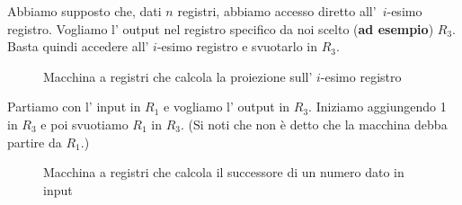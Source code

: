 \begin{esempio}[Proiezione \( p_n^i(x_1, \ldots, x_n)=x_i \).]

    Abbiamo supposto che, dati \( n \) registri, abbiamo accesso
    diretto \mbox{all' \( i \)-esimo} registro. Vogliamo l' output nel
    registro specifico da noi scelto (\textbf{ad esempio}) \( R_{3}
\). Basta quindi accedere all' \( i \)-esimo registro e svuotarlo
    in \( R_{3} \).

    \begin{figure}[hbtp]
    \hspace{0cm}
    \caption{Macchina a registri che calcola la proiezione sull' \( i \)-esimo registro}
    \end{figure}

\end{esempio}

\begin{esempio}[Successore]

    Partiamo con l' input in \( R_1 \) e vogliamo l' output in \(
R_{3} \). Iniziamo aggiungendo 1 in \( R_{3} \) e poi svuotiamo \(
R_1 \) in \( R_{3} \). (Si noti che non \`e detto che la macchina
    debba partire da \( R_1 \).)

    \begin{figure}[hbtp]
    \hspace{0cm}
    \caption{Macchina a registri che calcola il successore di un numero dato in input}
    \end{figure}

\end{esempio}

